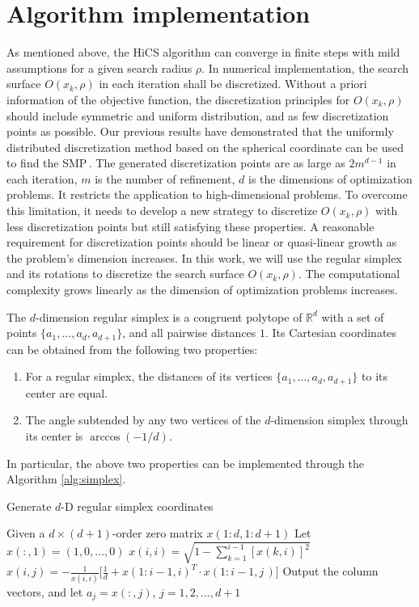 \documentclass[final,1p,times]{elsarticle}
\begin{document}
\section{Algorithm implementation}
\label{sec:implement}

As mentioned above, the HiCS algorithm can converge in  
finite steps with mild assumptions for a given search radius $\rho$.
In numerical implementation, the search surface $O(x_k,\rho)$ in
each iteration shall be discretized.
Without a priori information of the objective function,
the discretization principles for $O(x_k,\rho)$
should include symmetric and uniform distribution, and as few
discretization points as possible.
Our previous results have demonstrated that the uniformly distributed
discretization method based on the spherical coordinate
can be used to find the SMP\,\cite{huang2017hill}. 
The generated discretization points are as large as $2m^{d-1}$ in
each iteration, $m$ is the number of refinement, $d$ is the dimensions of
optimization problems. It restricts the
application to high-dimensional problems. 
To overcome this limitation, it needs to develop a new
strategy to discretize $O(x_k,\rho)$ with less discretization points
but still satisfying these properties.
A reasonable requirement for discretization points should be
linear or quasi-linear growth as the problem's dimension increases.
In this work, we will use the regular simplex and its rotations to
discretize the search surface $O(x_k,\rho)$. 
The computational complexity grows linearly as the
dimension of optimization problems increases.

The $d$-dimension regular simplex is a congruent polytope of
$\mathbb{R}^d$ with a set of points $\{a_1,\dots,a_d,a_{d+1}\}$,
and all pairwise distances $1$.
Its Cartesian coordinates can be obtained from the following two properties:
\begin{enumerate}
	\item For a regular simplex, the distances of its vertices 
		$\{a_1,\dots,a_d,a_{d+1}\}$ to its center are equal.
	\item The angle subtended by any two vertices of the 
		$d$-dimension simplex through its center is
		$\arccos(-1/d)$.
\end{enumerate}
In particular, the above two properties can be implemented
through the Algorithm \ref{alg:simplex}.
\begin{algorithm}
	\caption{Generate $d$-D regular simplex coordinates} 
	\label{alg:simplex}
\begin{algorithmic}
	\STATE Given a $d\times(d+1)$-order zero matrix $x(1:d,1:d+1)$
	\STATE Let $x(:,1) = (1,0,\dots,0)$
	\STATE $x(i,i)=\sqrt{1-\sum_{k=1}^{i-1} [x(k, i)]^{2}}$
		\STATE $x(i,j)
		=-\frac{1}{x(i,i)}\Big[\frac{1}{d}+x(1:i-1, i)^T \cdot
		x(1:i-1, j\,)\Big]$
		\ENDFOR
	\ENDFOR
	\STATE Output the column vectors, and let $a_j=x(:,j)$,
	$j=1,2,\dots,d+1$ 
\end{algorithmic}
\end{algorithm}
\end{document}
